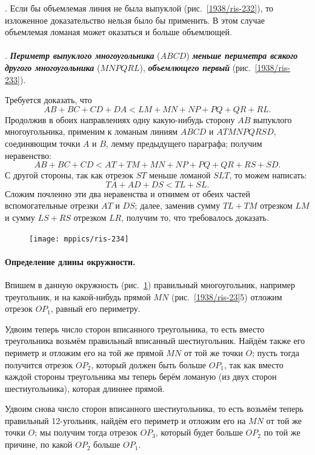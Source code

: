 \documentclass[oneside]{book}
\begin{document}
\smallskip
\mbox{.}
Если бы объемлемая линия не была выпуклой (рис.~\ref{1938/ris-232}), то изложенное доказательство нельзя было бы применить.
В этом случае объемлемая ломаная может оказаться и больше объемлющей.

\paragraph{}\label{1938/233}
.
\textbf{\emph{Периметр выпуклого многоугольника}} ($ABCD$) \textbf{\emph{меньше периметра всякого другого многоугольника}} ($MNPQRL$), \textbf{\emph{объемлющего первый}} (рис.~\ref{1938/ris-233}).

Требуется доказать, что
\[AB+BC+CD+DA < LM+MN+NP+PQ+QR+RL.\]
Продолжив в обоих направлениях одну какую-нибудь сторону $AB$ выпуклого многоугольника, применим к ломаным линиям $ABCD$ и $ATMNPQRSD$, соединяющим точки $A$ и $B$, лемму предыдущего параграфа;
получим неравенство:
\[AB+BC+CD<AT+TM+MN+NP+PQ+QR+RS+SD.\]
С другой стороны, так как отрезок $ST$ меньше ломаной $SLT$, то можем написать:
\[TA+AD+DS<TL+SL.\]
Сложим почленно эти два неравенства и отнимем от обеих частей вспомогательные отрезки $AT$ и $DS$;
далее, заменив сумму $TL+TM$ отрезком $LM$ и сумму $LS+RS$ отрезком $LR$, получим то, что требовалось доказать.

\begin{figure}
\centering
\texttt{[image: mppics/ris-234]}
\caption{}\label{1938/ris-234}
\end{figure}

\paragraph{Определение длины окружности.}\label{1938/234}
Впишем в данную окружность (рис.~\ref{1938/ris-234}) правильный многоугольник, например треугольник, и на какой-нибудь прямой $MN$ (рис.~\ref{1938/ris-23}5) отложим отрезок $OP_1$, равный его периметру.

Удвоим теперь число сторон вписанного треугольника, то есть
вместо треугольника возьмём правильный вписанный шестиугольник.
Найдём также его периметр и отложим его на той же прямой $MN$ от той же точки $O$;
пусть тогда получится отрезок $OP_2$, который должен быть больше $OP_1$, так как вместо каждой стороны треугольника мы теперь берём ломаную (из двух сторон шестиугольника), которая длиннее прямой.

Удвоим снова число сторон вписанного шестиугольника, то есть возьмём теперь правильный 12-угольник, найдём его периметр и отложим его на $MN$ от той же точки $O$; 
мы получим тогда отрезок $OP_3$, который будет больше $OP_2$ по той же причине, по какой $OP_2$ больше $OP_1$.
\end{document}
